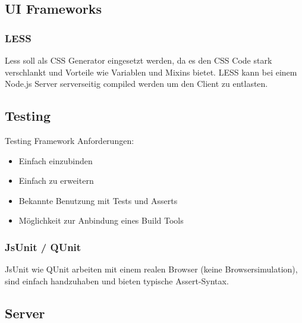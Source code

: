 		\subsection{UI Frameworks}
			\subsubsection{LESS}
				Less soll als CSS Generator eingesetzt werden, da es den CSS Code stark verschlankt und Vorteile wie Variablen und Mixins bietet. LESS kann bei einem Node.js Server serverseitig compiled werden um den Client zu entlasten.
				
		\subsection{Testing}
			Testing Framework Anforderungen:
			\begin{itemize}
				\item Einfach einzubinden
				\item Einfach zu erweitern
				\item Bekannte Benutzung mit Tests und Asserts
				\item Möglichkeit zur Anbindung eines Build Tools
			\end{itemize}

			\subsubsection{JsUnit / QUnit}
				JsUnit wie QUnit arbeiten mit einem realen Browser (keine Browsersimulation), 
				sind einfach handzuhaben und bieten typische Assert-Syntax.
				
				
	\subsection{Server}

